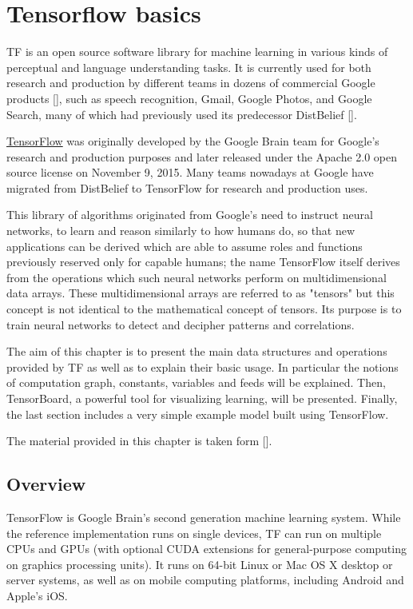 \chapter{Tensorflow basics}\label{ch:tensorflow_basics}

\ac{TF} is an open source software library for machine learning in various kinds of perceptual and language understanding tasks. It is currently used for both research and production by different teams in dozens of commercial Google products [\cite{DBLP:journals/corr/AbadiABBCCCDDDG16}], such as speech recognition, Gmail, Google Photos, and Google Search, many of which had previously used its predecessor DistBelief [\cite{40565}]. 

\href{https://www.tensorflow.org/}{TensorFlow} was originally developed by the Google Brain team for Google's research and production purposes and later released under the Apache 2.0 open source license on November 9, 2015.  Many teams nowadays at Google have migrated from DistBelief to TensorFlow for research and production uses.

This library of algorithms originated from Google's need to instruct neural networks, to learn and reason similarly to how humans do, so that new applications can be derived which are able to assume roles and functions previously reserved only for capable humans; the name TensorFlow itself derives from the operations which such neural networks perform on multidimensional data arrays. These multidimensional arrays are referred to as "tensors" but this concept is not identical to the mathematical concept of tensors. Its purpose is to train neural networks to detect and decipher patterns and correlations.

The aim of this chapter is to present the main data structures and operations provided by \acs{TF} as well as to explain their basic usage. In particular the notions of computation graph, constants, variables and feeds will be explained. Then, TensorBoard, a powerful tool for visualizing learning, will be presented. Finally, the last section includes a very simple example model built using TensorFlow.

The material provided in this chapter is taken form [\cite{tensorflow}].

\section{Overview}

TensorFlow is Google Brain's second generation machine learning system. While the reference implementation runs on single devices, \ac{TF} can run on multiple \acsp{CPU} and \acsp{GPU} (with optional \acs{CUDA} extensions for general-purpose computing on graphics processing units). It runs on 64-bit Linux or Mac OS X desktop or server systems, as well as on mobile computing platforms, including Android and Apple's iOS.

